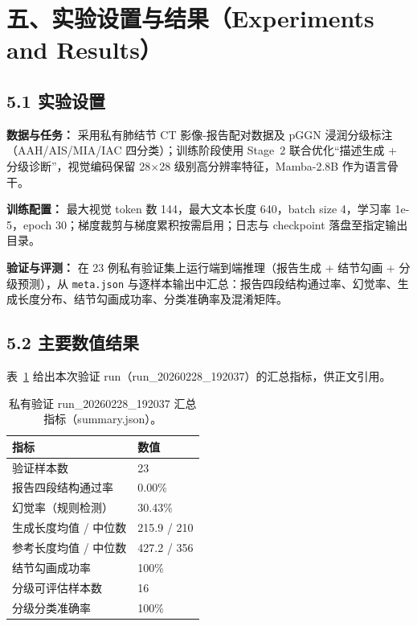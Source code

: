 
\section*{五、实验设置与结果（Experiments and Results）}

\subsection*{5.1 实验设置}

\textbf{数据与任务：} 采用私有肺结节 CT 影像-报告配对数据及 pGGN 浸润分级标注（AAH/AIS/MIA/IAC 四分类）；训练阶段使用 Stage~2 联合优化“描述生成 + 分级诊断”，视觉编码保留 28$\times$28 级别高分辨率特征，Mamba-2.8B 作为语言骨干。

\textbf{训练配置：} 最大视觉 token 数 144，最大文本长度 640，batch size 4，学习率 1e-5，epoch 30；梯度裁剪与梯度累积按需启用；日志与 checkpoint 落盘至指定输出目录。

\textbf{验证与评测：} 在 23 例私有验证集上运行端到端推理（报告生成 + 结节勾画 + 分级预测），从 \texttt{meta.json} 与逐样本输出中汇总：报告四段结构通过率、幻觉率、生成长度分布、结节勾画成功率、分类准确率及混淆矩阵。

\subsection*{5.2 主要数值结果}

表~\ref{tab:exp-summary} 给出本次验证 run（run\_20260228\_192037）的汇总指标，供正文引用。

\begin{table}[htbp]
\centering
\footnotesize
\renewcommand{\arraystretch}{1.2}
\begin{tabular}{ll}
\toprule
\textbf{指标} & \textbf{数值} \\
\midrule
验证样本数 & 23 \\
报告四段结构通过率 & 0.00\% \\
幻觉率（规则检测） & 30.43\% \\
生成长度均值 / 中位数 & 215.9 / 210 \\
参考长度均值 / 中位数 & 427.2 / 356 \\
结节勾画成功率 & 100\% \\
分级可评估样本数 & 16 \\
分级分类准确率 & 100\% \\
\bottomrule
\end{tabular}
\caption{私有验证 run\_20260228\_192037 汇总指标（summary.json）。}
\label{tab:exp-summary}
\end{table}


